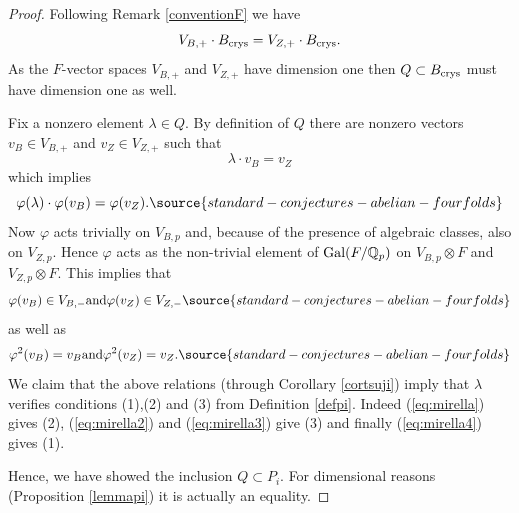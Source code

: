 \begin{proof}
 Following Remark \ref{conventionF} we have
 \begin{equation} \label{eq:mirella0}V_{B,+} \cdot B_{\textnormal{crys}} =  V_{Z,+} \cdot B_{\textnormal{crys}}.\end{equation}
  As the  $F$-vector spaces $V_{B,+} $ and $ V_{Z,+}$ have dimension one   then $Q\subset B_{\textnormal{crys}}$ must have dimension one as well.

Fix a nonzero element $\lambda \in Q$. By definition of $Q$ there are nonzero vectors $v_B \in V_{B,+} $ and $v_Z \in V_{Z,+} $ such that
\begin{equation} \label{eq:mirella} \lambda \cdot v_{B} = v_{Z}  \end{equation}
which implies
\begin{equation} \label{eq:mirella2} \varphi(\lambda) \cdot \varphi(v_{B}) = \varphi(v_{Z}).
\source{standard-conjectures-abelian-fourfolds}
\end{equation}
Now  $\varphi$ acts trivially on $V_{B,p}$ and,  because of the presence of algebraic classes, also on $V_{Z,p}$. Hence $\varphi$ acts as the non-trivial element of $\textnormal{Gal}(F/\mathbb{Q}_p)$ on $V_{B,p}\otimes F$ and  $V_{Z,p}\otimes F$. This implies that
\begin{equation} \label{eq:mirella3} \varphi(v_{B})  \in V_{B,-}   \textrm{and}  \varphi(v_{Z})  \in V_{Z,-}
\source{standard-conjectures-abelian-fourfolds}
\end{equation}
as well as
\begin{equation} \label{eq:mirella4} \varphi^2(v_B)=v_B   \textrm{and}    \varphi^2(v_Z)=v_Z.
\source{standard-conjectures-abelian-fourfolds}
\end{equation}
We claim that  the above relations (through Corollary \ref{cortsuji}) imply   that $\lambda$ verifies conditions (1),(2) and (3) from Definition \ref{defpi}. Indeed (\ref{eq:mirella}) gives (2), (\ref{eq:mirella2}) and  (\ref{eq:mirella3}) give (3) and finally  (\ref{eq:mirella4}) gives (1).

Hence, we have showed the  inclusion $Q \subset P_i$. For dimensional reasons (Proposition \ref{lemmapi}) it is actually an equality.
\end{proof}

